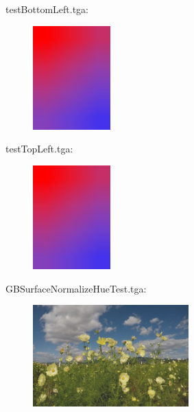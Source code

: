testBottomLeft.tga:\\
\begin{center}
\begin{figure}[H]
\centering\includegraphics[width=3cm]{./testBottomLeft.png}\\
\end{figure}
\end{center}

testTopLeft.tga:\\
\begin{center}
\begin{figure}[H]
\centering\includegraphics[width=3cm]{./testTopLeft.png}\\
\end{figure}
\end{center}

GBSurfaceNormalizeHueTest.tga:\\
\begin{center}
\begin{figure}[H]
\centering\includegraphics[width=6cm]{./GBSurfaceNormalizeHueTest.png}\\
\end{figure}
\end{center}

